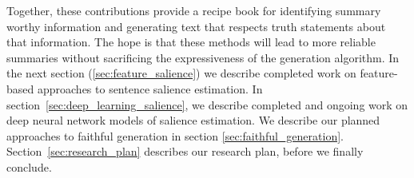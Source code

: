 
Together, these contributions
provide a recipe book for identifying summary worthy information and 
generating text that respects truth statements about that information.
The hope is that these methods will lead to more reliable summaries
without sacrificing the expressiveness of the generation algorithm. 
In the next section (\autoref{sec:feature_salience}) 
we describe completed work on feature-based approaches to sentence salience estimation. 
In section~\ref{sec:deep_learning_salience}, we describe completed and ongoing
 work on deep neural network models
of salience estimation. We describe our planned approaches to faithful 
generation in section \ref{sec:faithful_generation}. 
Section~\ref{sec:research_plan} describes our research plan, before 
we finally conclude.




